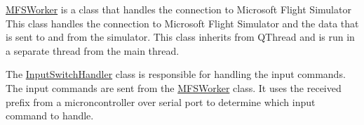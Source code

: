 \mbox{\hyperlink{class_m_f_s_worker}{MFSWorker}} is a class that handles the connection to Microsoft Flight Simulator This class handles the connection to Microsoft Flight Simulator and the data that is sent to and from the simulator. This class inherits from QThread and is run in a separate thread from the main thread.

The \mbox{\hyperlink{class_input_switch_handler}{Input\+Switch\+Handler}} class is responsible for handling the input commands. The input commands are sent from the \mbox{\hyperlink{class_m_f_s_worker}{MFSWorker}} class. It uses the received prefix from a microncontroller over serial port to determine which input command to handle. 